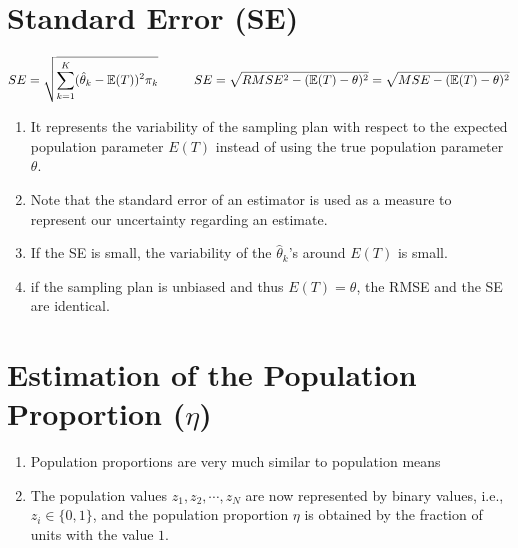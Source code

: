 \section{Standard Error (SE)}

\[
    \hfill
    SE = \sqrt{
        \displaystyle\sum_{k=1}^{K}
        (\hat{\theta}_k - \mathbb{E}(T))^2\pi_k
    }
    \hspace{1cm}
    SE = \sqrt{RMSE^2 - (\mathbb{E}(T) - \theta)^2}
    = \sqrt{MSE - (\mathbb{E}(T) - \theta)^2}
    \hfill
\]

\begin{enumerate}
    \item It represents the variability of the sampling plan with respect to the expected population parameter $E(T)$ instead of using the true population parameter $\theta$.

    \item Note that the standard error of an estimator is used as a measure to represent our uncertainty regarding an estimate.

    \item If the SE is small, the variability of the $\hat{\theta}_k$’s around $E(T)$ is small.

    \item if the sampling plan is unbiased and thus $E(T) = \theta$, the RMSE and the SE are identical.

\end{enumerate}

\section{Estimation of the Population Proportion ($\eta$) \cite{ism-1}}\label{Estimation of the Population Proportion}

\begin{enumerate}
    \item Population proportions are very much similar to population means

    \item The population values $z_1, z_2,\cdots,z_N$ are now represented by binary values, i.e., $z_i \in \{0, 1\}$, and the population proportion $\eta$ is obtained by the fraction of units with the value $1$.
\end{enumerate}

